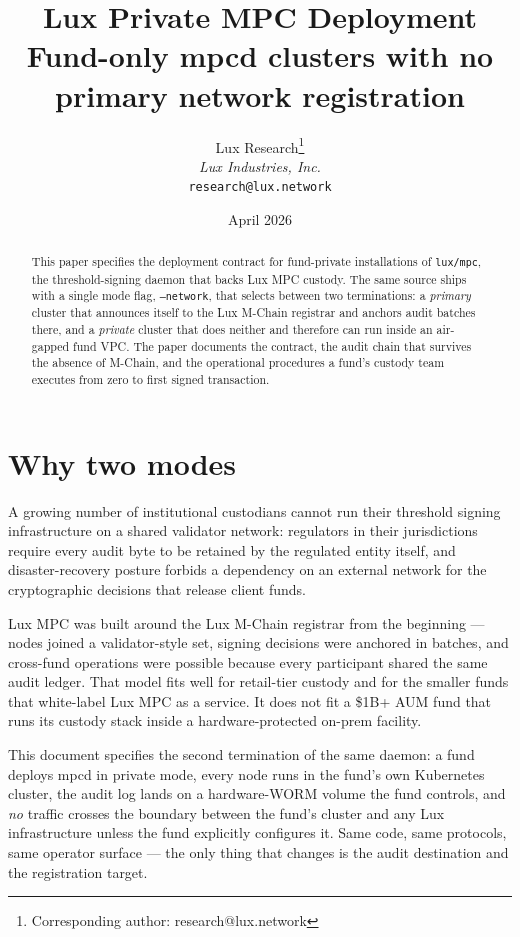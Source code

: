\documentclass[11pt,a4paper]{article}
\title{Lux Private MPC Deployment\\
\large Fund-only mpcd clusters with no primary network registration}
\author{Lux Research\thanks{Corresponding author: research@lux.network}\\
\textit{Lux Industries, Inc.}\\
\texttt{research@lux.network}}
\date{April 2026}
\begin{document}
\luxcoverpage
\maketitle

\begin{abstract}
This paper specifies the deployment contract for fund-private installations of
\texttt{lux/mpc}, the threshold-signing daemon that backs Lux MPC custody.
The same source ships with a single mode flag, \texttt{--network}, that selects
between two terminations: a \emph{primary} cluster that announces itself to
the Lux M-Chain registrar and anchors audit batches there, and a
\emph{private} cluster that does neither and therefore can run inside an
air-gapped fund VPC. The paper documents the contract, the audit chain that
survives the absence of M-Chain, and the operational procedures a fund's
custody team executes from zero to first signed transaction.
\end{abstract}

\tableofcontents

\section{Why two modes}

A growing number of institutional custodians cannot run their threshold
signing infrastructure on a shared validator network: regulators in their
jurisdictions require every audit byte to be retained by the regulated
entity itself, and disaster-recovery posture forbids a dependency on an
external network for the cryptographic decisions that release client funds.

Lux MPC was built around the Lux M-Chain registrar from the beginning ---
nodes joined a validator-style set, signing decisions were anchored in
batches, and cross-fund operations were possible because every participant
shared the same audit ledger. That model fits well for retail-tier
custody and for the smaller funds that white-label Lux MPC as a service.
It does not fit a \$1B+ AUM fund that runs its custody stack inside a
hardware-protected on-prem facility.

This document specifies the second termination of the same daemon: a
fund deploys mpcd in private mode, every node runs in the fund's own
Kubernetes cluster, the audit log lands on a hardware-WORM volume the
fund controls, and \emph{no} traffic crosses the boundary between the
fund's cluster and any Lux infrastructure unless the fund explicitly
configures it. Same code, same protocols, same operator surface --- the
only thing that changes is the audit destination and the registration
target.
\end{document}
